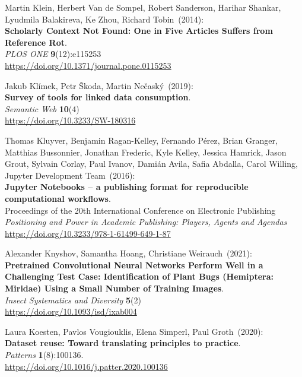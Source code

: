\begin{thebibliography}{9}
Martin Klein, Herbert Van de Sompel, Robert Sanderson, Harihar Shankar,
Lyudmila Balakireva, Ke Zhou, Richard Tobin~(2014): \\
\textbf{Scholarly Context Not Found: One in Five Articles Suffers from Reference Rot}.\\
\emph{PLOS ONE} \textbf{9}(12):e115253\\
\url{https://doi.org/10.1371/journal.pone.0115253}

Jakub Klímek, Petr Škoda, Martin Nečaský~(2019): \\
\textbf{Survey of tools for linked data consumption}. \\
\emph{Semantic Web} \textbf{10}(4) \\
\url{https://doi.org/10.3233/SW-180316}

Thomas Kluyver, Benjamin Ragan-Kelley, Fernando Pérez, Brian Granger, Matthias Bussonnier, Jonathan Frederic, Kyle Kelley, Jessica Hamrick, Jason Grout, Sylvain Corlay, Paul Ivanov, Damián Avila, Safia Abdalla, Carol Willing, Jupyter Development Team~(2016): \\
\textbf{Jupyter Notebooks – a publishing format for reproducible computational workflows}.\\
Proceedings of the 20th International Conference on Electronic Publishing\\
\emph{Positioning and Power in Academic Publishing: Players, Agents and Agendas}\\ 
\url{https://doi.org/10.3233/978-1-61499-649-1-87}

Alexander Knyshov, Samantha Hoang, Christiane Weirauch~(2021): \\
\textbf{Pretrained Convolutional Neural Networks Perform Well in a Challenging Test Case:
Identification of Plant Bugs (Hemiptera: Miridae) Using a Small Number
of Training Images}. \\
\emph{Insect Systematics and Diversity} \textbf{5}(2)\\
\url{https://doi.org/10.1093/isd/ixab004}

Laura Koesten, Pavlos Vougiouklis, Elena Simperl, Paul Groth~(2020): \\
\textbf{Dataset reuse: Toward translating principles to practice}.\\
\emph{Patterns} \textbf{1}(8):100136.\\
\url{https://doi.org/10.1016/j.patter.2020.100136}


\end{thebibliography}
